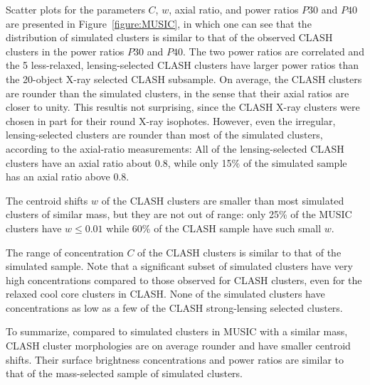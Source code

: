 \documentclass[iop,twocolumn]{emulateapj}
\begin{document}
{Scatter plots for the parameters $C$, $w$, axial ratio, and power ratios $P30$ and $P40$
are presented in Figure~\ref{figure:MUSIC}, in which one can see that 
the distribution of simulated clusters is similar to that of 
the observed CLASH clusters in the power ratios $P30$ and $P40$. 
The two power ratios are correlated and the 5 less-relaxed, lensing-selected CLASH clusters 
have larger power ratios than the 20-object X-ray selected CLASH subsample.
On average, the CLASH clusters are rounder than the simulated clusters, 
in the sense that their axial ratios are closer to unity. 
This resultis not surprising, since the CLASH X-ray clusters were chosen in part for their round X-ray isophotes. 
However, even the irregular, lensing-selected clusters are rounder than most of the simulated clusters, 
according to the axial-ratio measurements:  All of the lensing-selected CLASH clusters have an axial ratio about 0.8, while 
only 15\% of the simulated sample has an axial ratio above 0.8.

The centroid shifts $w$ of the CLASH clusters are smaller than most
simulated clusters of similar mass, but they are not out of range: only 25\% of the
MUSIC clusters have $w \leq 0.01$ while 60\% of the CLASH sample have
such small $w$.

The range of concentration $C$ of the CLASH clusters is similar to
that of the simulated sample. Note that a significant subset of simulated clusters have
very high concentrations compared to those observed for CLASH
clusters, even for the relaxed cool core clusters in CLASH. None of the
simulated clusters have concentrations as low as a few of the CLASH
strong-lensing selected clusters.

 To summarize, compared to simulated clusters in MUSIC with a similar
mass, CLASH cluster morphologies are on average rounder and have
smaller centroid shifts. Their surface brightness concentrations and power ratios are
similar to that of the mass-selected sample of simulated clusters.


}
\end{document}
